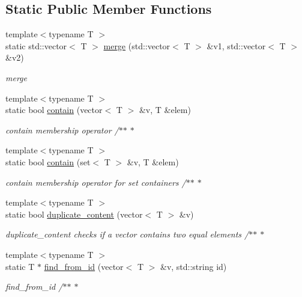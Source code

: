 \subsection*{Static Public Member Functions}
\begin{DoxyCompactItemize}
\item 
{\footnotesize template$<$typename T $>$ }\\static std\+::vector$<$ T $>$ \hyperlink{class_utils_afc63a897787a89008c17a4834f0362d4}{merge} (std\+::vector$<$ T $>$ \&v1, std\+::vector$<$ T $>$ \&v2)
\begin{DoxyCompactList}\small\item\em merge \end{DoxyCompactList}\item 
{\footnotesize template$<$typename T $>$ }\\static bool \hyperlink{class_utils_a59515972c2cd159f8d019cba3647393d}{contain} (vector$<$ T $>$ \&v, T \&elem)
\begin{DoxyCompactList}\small\item\em contain membership operator /$\ast$$\ast$ $\ast$ \end{DoxyCompactList}\item 
{\footnotesize template$<$typename T $>$ }\\static bool \hyperlink{class_utils_af118b2c4ad73a2284addc4846e98d1ef}{contain} (set$<$ T $>$ \&v, T \&elem)
\begin{DoxyCompactList}\small\item\em contain membership operator for set containers /$\ast$$\ast$ $\ast$ \end{DoxyCompactList}\item 
{\footnotesize template$<$typename T $>$ }\\static bool \hyperlink{class_utils_ae444cd6b2dc77be3bb1f8440fe40f8cd}{duplicate\+\_\+content} (vector$<$ T $>$ \&v)
\begin{DoxyCompactList}\small\item\em duplicate\+\_\+content checks if a vector contains two equal elements /$\ast$$\ast$ $\ast$ \end{DoxyCompactList}\item 
{\footnotesize template$<$typename T $>$ }\\static T $\ast$ \hyperlink{class_utils_a570aaceb177c0232d750350fa000d369}{find\+\_\+from\+\_\+id} (vector$<$ T $>$ \&v, std\+::string id)
\begin{DoxyCompactList}\small\item\em find\+\_\+from\+\_\+id /$\ast$$\ast$ $\ast$ \end{DoxyCompactList}\item 

\end{DoxyCompactItemize}

